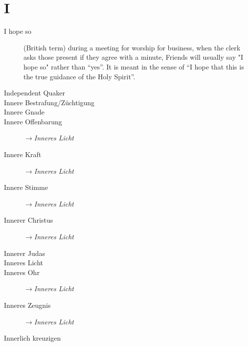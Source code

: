 \section*{I}

\articlesize

\begin{description}

\item[I hope so]
    (British term) during a meeting for worship for business, when the clerk asks those present if they agree with a minute, Friends will usually say "I hope so" rather than "`yes"'. It is meant in the sense of "`I hope that this is the true guidance of the Holy Spirit"'.

\item[Independent Quaker]

 \item[Innere Bestrafung/Züchtigung]
 \item[Innere Gnade]
 \item[Innere Offenbarung] $\to$\textit{Inneres Licht}
 \item[Innere Kraft] $\to$\textit{Inneres Licht}
 \item[Innere Stimme] $\to$\textit{Inneres Licht}
 \item[Innerer Christus] $\to$\textit{Inneres Licht}
 \item[Innerer Judas]
 \item[Inneres Licht]
 \item[Inneres Ohr] $\to$\textit{Inneres Licht}
 \item[Inneres Zeugnis] $\to$\textit{Inneres Licht}
 \item[Innerlich kreuzigen]
 \end{description}

\normalsize